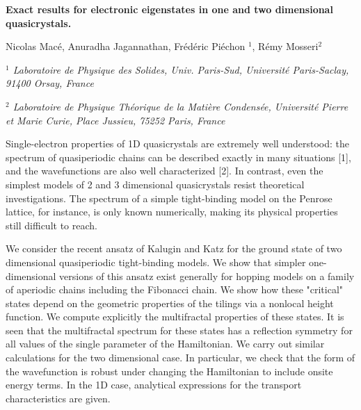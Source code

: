 \documentclass[a4paper,10pt]{letter}
\begin{document}
\begin{center}
{\Large \bf Exact results for electronic eigenstates in one and two dimensional quasicrystals.}
\vspace{1cm}

Nicolas Macé, Anuradha Jagannathan, Frédéric Piéchon $^1$, Rémy Mosseri$^2$

\vspace{0.5cm}
{\it $^1$ Laboratoire de Physique des Solides, Univ. Paris-Sud, Université Paris-Saclay, 91400 Orsay, France}

{\it $^2$ Laboratoire de Physique Théorique de la Matière Condensée, Université Pierre et Marie Curie, Place Jussieu, 75252 Paris, France}

\end{center}

\vspace{2cm}


Single-electron properties of 1D quasicrystals are extremely well understood: the spectrum of quasiperiodic chains can be described exactly in many situations [1], and the wavefunctions are also well characterized [2].
In contrast, even the simplest models of 2 and 3 dimensional quasicrystals resist theoretical investigations. The spectrum of a simple tight-binding model on the Penrose lattice, for instance, is only known numerically, making its physical properties still difficult to reach.

We consider the recent ansatz of Kalugin and Katz for the ground state of two dimensional quasiperiodic tight-binding models.
We show that simpler one-dimensional versions of this ansatz exist generally for hopping models on a family of aperiodic chains including the Fibonacci chain. 
We show how these "critical" states depend on the geometric properties of the tilings via a nonlocal height function. We compute explicitly the multifractal properties of these states. 
It is seen that the multifractal spectrum for these states has a reflection symmetry for all values of the single parameter of the Hamiltonian.
We carry out similar calculations for the two dimensional case.
In particular, we check that the form of the wavefunction is robust under changing the Hamiltonian to include onsite energy terms.
In the 1D case, analytical expressions for the transport characteristics are given. 
\end{document}
